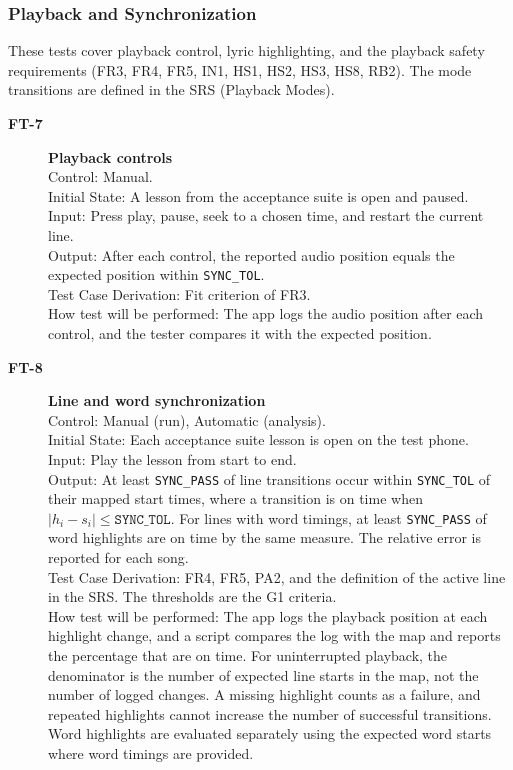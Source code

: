 \documentclass[12pt, titlepage]{article}
\newcommand{\tid}[1]{\hypertarget{test:#1}{\textbf{#1}}}
\newcommand{\cn}[1]{\texttt{#1}}
\begin{document}
\subsubsection{Playback and Synchronization} \label{SecPlaybackTests}

These tests cover playback control, lyric highlighting, and the playback
safety requirements (FR3, FR4, FR5, IN1, HS1, HS2, HS3, HS8, RB2). The mode
transitions are defined in the SRS (Playback Modes).

\begin{description}

\item[\tid{FT-7}] \textbf{Playback controls}\\
Control: Manual.\\
Initial State: A lesson from the acceptance suite is open and paused.\\
Input: Press play, pause, seek to a chosen time, and restart the current
line.\\
Output: After each control, the reported audio position equals the expected
position within \cn{SYNC\_TOL}.\\
Test Case Derivation: Fit criterion of FR3.\\
How test will be performed: The app logs the audio position after each control,
and the tester compares it with the expected position.

\item[\tid{FT-8}] \textbf{Line and word synchronization}\\
Control: Manual (run), Automatic (analysis).\\
Initial State: Each acceptance suite lesson is open on the test phone.\\
Input: Play the lesson from start to end.\\
Output: At least \cn{SYNC\_PASS} of line transitions occur within
\cn{SYNC\_TOL} of their mapped start times, where a transition is on time when
$|h_i - s_i| \le \cn{SYNC\_TOL}$. For lines with word timings, at least
\cn{SYNC\_PASS} of word highlights are on time by the same measure. The
relative error is reported for each song.\\
Test Case Derivation: FR4, FR5, PA2, and the definition of the active line in the
SRS. The thresholds are the G1 criteria.\\
How test will be performed: The app logs the playback position at each
highlight change, and a script compares the log with the map and reports the
percentage that are on time. For uninterrupted playback, the denominator
is the number of expected line starts in the map, not the number of
logged changes. A missing highlight counts as a failure, and repeated
highlights cannot increase the number of successful transitions.
Word highlights are evaluated separately using the expected word starts
where word timings are provided.


\end{description}
\end{document}
